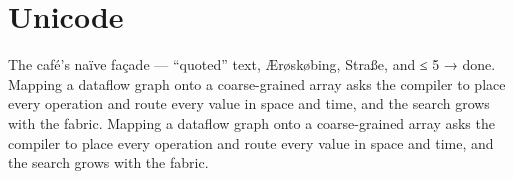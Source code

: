 \documentclass{article}
\begin{document}
\section{Unicode}
The café’s naïve façade — “quoted” text, Ærøskøbing, Straße, and ≤ 5 → done. Mapping a dataflow graph onto a coarse-grained array asks the compiler to place every operation and route every value in space and time, and the search grows with the fabric. Mapping a dataflow graph onto a coarse-grained array asks the compiler to place every operation and route every value in space and time, and the search grows with the fabric.
\end{document}
